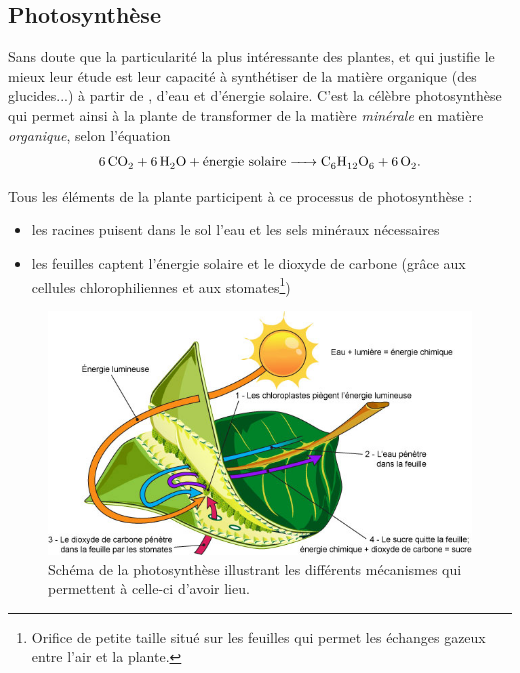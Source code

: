 \subsection{Photosynthèse}
\label{subsubsec:photosynthese}
Sans doute que la particularité la plus intéressante des plantes, et qui justifie le mieux leur étude est leur capacité à synthétiser de la matière organique (des glucides...) à partir de , d'eau et d'énergie solaire. C'est la célèbre photosynthèse qui permet ainsi à la plante de 
transformer de la matière \emph{minérale} en matière \emph{organique},
selon l'équation
\begin{equation}
	\ce{6CO2 + 6H2O + \text{énergie solaire} -> C6H12O6 + 6O2 }.
  \label{eq:photosynthese}
\end{equation}

Tous les éléments de la plante participent à ce processus de photosynthèse :
\begin{itemize}
	\item les racines puisent dans le sol l'eau et les sels minéraux nécessaires		
	\item les feuilles captent l'énergie solaire et le dioxyde de carbone 
  (grâce aux cellules chlorophiliennes 
  et aux stomates\footnote{Orifice de petite taille situé sur les feuilles 
  qui permet les échanges gazeux entre l'air et la plante.})
\end{itemize}

\begin{figure}[h]
	\begin{center}
  \includegraphics[scale=0.51]{./img/photosynthese.jpg}
  \caption{Schéma de la photosynthèse illustrant les différents 
  mécanismes qui permettent à celle-ci d'avoir lieu.}
  \label{fig:photosynthèse}
	\end{center}
\end{figure}

